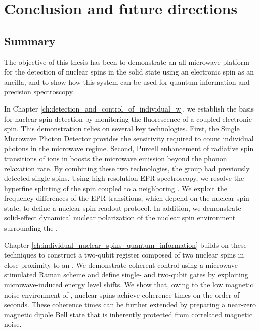 \chapter{Conclusion and future directions}
\label{ch:conclusion}

\section*{Summary}

The objective of this thesis has been to demonstrate an all-microwave platform for the detection of nuclear spins in the solid state using an electronic spin as an ancilla, and to show how this system can be used for quantum information and precision spectroscopy.

In Chapter \ref{ch:detection_and_control_of_individual_w}, we establish the basis for nuclear spin detection by monitoring the fluorescence of a coupled electronic spin. This demonstration relies on several key technologies. First, the Single Microwave Photon Detector provides the sensitivity required to count individual photons in the microwave regime. Second, Purcell enhancement of radiative spin transitions of \Er ions in \Ca boosts the microwave emission beyond the phonon relaxation rate. By combining these two technologies, the group had previously detected single \Er spins. Using high-resolution EPR spectroscopy, we resolve the hyperfine splitting of the \Er spin coupled to a neighboring \W. We exploit the frequency differences of the EPR transitions, which depend on the \W nuclear spin state, to define a nuclear spin readout protocol. In addition, we demonstrate solid-effect dynamical nuclear polarization of the nuclear spin environment surrounding the \Er.

Chapter \ref{ch:individual_nuclear_spins_quantum_information} builds on these techniques to construct a two-qubit register composed of two \W nuclear spins in close proximity to an \Er. We demonstrate coherent control using a microwave-stimulated Raman scheme and define single- and two-qubit gates by exploiting microwave-induced energy level shifts. We show that, owing to the low magnetic noise environment of \Ca, nuclear spins achieve coherence times on the order of seconds. These coherence times can be further extended by preparing a near-zero magnetic dipole Bell state that is inherently protected from correlated magnetic noise.

